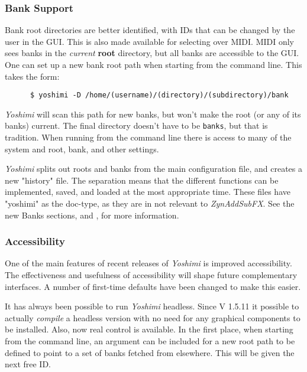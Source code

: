 \documentclass[
 11pt,
 twoside,
 a4paper,
 final                                 %
]{article}
\begin{document}
\subsubsection{Bank Support}
\label{subsubsec:new_features_bank_support}

   Bank root directories are better identified, with IDs that can be changed by
   the user in the GUI. This is also made available for selecting over MIDI.
   MIDI only sees banks in the \textsl{current}
   \textbf{root} directory, but all banks are accessible to the GUI.
   One can set up a new bank root path when starting from the
   command line. This takes the form:

   \begin{verbatim}
      $ yoshimi -D /home/(username)/(directory)/(subdirectory)/bank
   \end{verbatim}

   \textsl{Yoshimi} will scan this path for new banks, but
   won't make the root (or any of its banks) current. The final directory
   doesn't have to be \texttt{banks}, but that is tradition.
   When running from the command line there is access to many
   of the system and root, bank, and other settings.

   \textsl{Yoshimi} splits out roots and banks from the main configuration
   file, and creates a new "history" file. The separation means that the
   different functions can be implemented, saved, and loaded at the most
   appropriate time. These files have "yoshimi" as the doc-type, as they are in
   not relevant to \textsl{ZynAddSubFX}.
   See the new Banks sections,
   and
   ,
   for more information.

\subsubsection{Accessibility}
\label{subsubsec:new_features_accessibility}

   One of the main features of recent releases of \textsl{Yoshimi} is improved
   accessibility. The effectiveness and usefulness of accessibility will
   shape future complementary interfaces. A number of first-time defaults
   have been changed to make this easier.

   It has always been possible to run \textsl{Yoshimi} headless. Since V 1.5.11
   it possible to actually \textsl{compile} a headless version with no need for
   any graphical components to be installed.
   Also, now real control is available. In the first place, when starting from
   the command line, an argument can be included for a new root path to be defined
   to point to a set of banks fetched from elsewhere. This will be given the next
   free ID.
\end{document}
